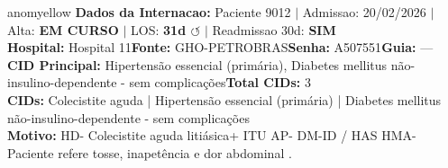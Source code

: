 \documentclass[a4paper,10pt]{article}
\begin{document}
\newpage

\begin{anomalycard}[Internacao 166323 | GHO-PETROBRAS | MODERADO (z=2.38)]{anomyellow}
\textbf{Dados da Internacao:} Paciente 9012 $\mid$ Admissao: 20/02/2026 $\mid$ Alta: \textcolor{anomorange}{\textbf{EM CURSO}} $\mid$ LOS: \textbf{31d \textcolor{anomorange}{$\circlearrowleft$}} $\mid$ Readmissao 30d: \textcolor{anomred}{\textbf{SIM}}\\
\textbf{Hospital:} Hospital 11\quad\textbf{Fonte:} GHO-PETROBRAS\quad\textbf{Senha:} A507551\quad\textbf{Guia:} ---\\
\textbf{CID Principal:} {\small Hipertensão essencial (primária), Diabetes mellitus não-insulino-dependente - sem complicações}\quad\textbf{Total CIDs:} 3\\

\textbf{CIDs:} {\scriptsize Colecistite aguda | Hipertensão essencial (primária) | Diabetes mellitus não-insulino-dependente - sem complicações}\\

\textbf{Motivo:} {\scriptsize HD- Colecistite aguda litiásica+ ITU    AP- DM-ID / HAS   HMA- Paciente refere tosse, inapetência e dor abdominal .}\\


\end{anomalycard}
\end{document}
